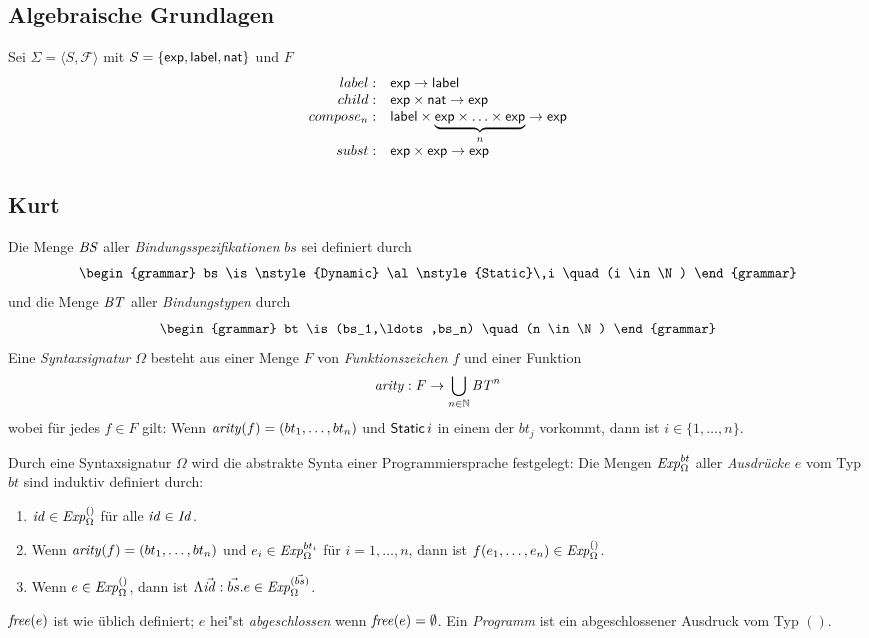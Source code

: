 \documentclass[12pt,a4paper,draft]{article}
\begin{document}
\clearpage


\subsection*{Algebraische Grundlagen}

Sei $\Sigma = \langle S, \mathcal{F} \rangle$ mit 
$S = \{\mathsf{exp},\mathsf{label},\mathsf{nat}\}$ und $F$
\[\begin{array}{rl}
label:& \mathsf{exp} \to \mathsf{label}\\
child:& \mathsf{exp} \times \mathsf{nat} \to \mathsf{exp}\\
compose_n:& \mathsf{label} \times \underbrace{\mathsf{exp} \times \ldots \times \mathsf{exp}}_n \to \mathsf{exp}\\
subst:& \mathsf{exp} \times \mathsf{exp} \to \mathsf{exp}\\
\end{array}\]


\subsection*{Kurt}

Die Menge $\mathit{BS}$ aller \emph{Bindungsspezifikationen} $bs$ sei definiert durch
\[\begin{grammar}
bs
\is \nstyle{Dynamic}
\al \nstyle{Static}\,i \quad (i \in \N)
\end{grammar}\]
und die Menge $\mathit{BT}$ aller \emph{Bindungstypen} durch
\[\begin{grammar}
bt \is (bs_1,\ldots,bs_n) \quad (n \in \N)
\end{grammar}\]
Eine \emph{Syntaxsignatur} $\Omega$ besteht aus einer Menge $F$ von \emph{Funktionszeichen} $f$
und einer Funktion
\[
\mathit{arity}: F \to \bigcup_{n\in\mathbb N}\mathit{BT}^n
\]
wobei f\"ur jedes $f \in F$ gilt: Wenn $\mathit{arity}(f) = (bt_1,\ldots,bt_n)$ und
$\mathsf{Static}\,i$ in einem der $bt_j$ vorkommt, dann ist $i \in \{1,\ldots,n\}$.

Durch eine Syntaxsignatur $\Omega$ wird die abstrakte Synta einer Programmiersprache
festgelegt: Die Mengen $\mathit{Exp}^{bt}_\Omega$ aller \emph{Ausdr\"ucke $e$} vom
Typ $bt$ sind induktiv definiert durch:
\begin{enumerate}
\item $\mathit{id} \in \mathit{Exp}^{()}_\Omega$ f\"ur alle $\mathit{id} \in \mathit{Id}$.
\item Wenn $\mathit{arity}(f)=(bt_1,\ldots,bt_n)$ und $e_i \in \mathit{Exp}^{bt_i}_\Omega$ f\"ur $i=1,\ldots,n$,
  dann ist $f(e_1,\ldots,e_n) \in \mathit{Exp}^{()}_\Omega$.
\item Wenn $e \in \mathit{Exp}^{()}_\Omega$, dann ist $\Lambda \vec{\mathit{id}}:\vec{bs}.e \in \mathit{Exp}^{(\vec{bs})}_\Omega$.
\end{enumerate}
$\mathit{free}(e)$ ist wie \"ublich definiert; $e$ hei"st \emph{abgeschlossen} wenn $\mathit{free}(e) = \emptyset$.
Ein \emph{Programm} ist ein abgeschlossener Ausdruck vom Typ $()$.
\end{document}
